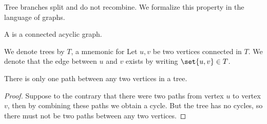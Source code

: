 

Tree branches split
and do not recombine.
We formalize this
property in the
language of graphs.


A
is a
connected
acyclic graph.


We denote trees by $T$,
a mnemonic for 
Let $u, v$ be two vertices
connected in $T$.
We denote that the edge
between $u$ and $v$ exists
by writing $\set{u, v} \in T$.


\begin{prop}
  There is only one
  path between
  any two vertices in a tree.

\begin{proof}
  Suppose to the contrary that
  there were two paths from
  vertex $u$ to vertex $v$,
  then by combining these paths
  we obtain a cycle. But the
  tree has no cycles,
  so there must not be two paths
  between any two vertices.
\end{proof}
\end{prop}
